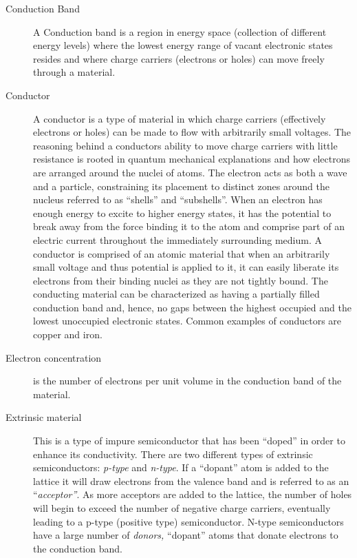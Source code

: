 \documentclass{../lab}
\begin{document}
\begin{description}
    \item[Conduction Band] A Conduction band is a region in energy space (collection of different energy levels) where the lowest energy range of vacant electronic states resides and where charge carriers (electrons or holes) can move freely through a material.

    \item[Conductor] A conductor is a type of material in which charge carriers (effectively electrons or holes) can be made to flow with arbitrarily small voltages. The reasoning behind a conductors ability to move charge carriers with little resistance is rooted in quantum mechanical explanations and how electrons are arranged around the nuclei of atoms. The electron acts as both a wave and a particle, constraining its placement to distinct zones around the nucleus referred to as ``shells'' and ``subshells''. When an electron has enough energy to excite to higher energy states, it has the potential to break away from the force binding it to the atom and comprise part of an electric current throughout the immediately surrounding medium. A conductor is comprised of an atomic material that when an arbitrarily small voltage and thus potential is applied to it, it can easily liberate its electrons from their binding nuclei as they are not tightly bound.  The conducting material can be characterized as having a partially filled conduction band and, hence, no gaps between the highest occupied and the lowest unoccupied electronic states. Common examples of conductors are copper and iron.

    \item[Electron concentration] is the number of electrons per unit volume in the conduction band of the material.

    \item[Extrinsic material] This is a type of impure semiconductor that has been ``doped'' in order to enhance its conductivity. There are two different types of extrinsic semiconductors: \emph{p-type} and \emph{n-type}. If a ``dopant'' atom is added to the lattice it will draw electrons from the valence band and is referred to as an ``\emph{acceptor''}. As more acceptors are added to the lattice, the number of holes will begin to exceed the number of negative charge carriers, eventually leading to a p-type (positive type) semiconductor. N-type semiconductors have a large number of\emph{ donors,} ``dopant'' atoms that donate electrons to the conduction band.


\end{description}
\end{document}
